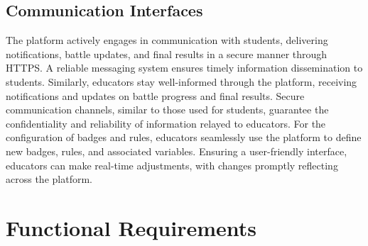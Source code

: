 \subsection{Communication Interfaces}
\label{subsec:communication_interfaces}%
The platform actively engages in communication with students, delivering notifications, battle updates, and final results in a secure manner through HTTPS. A reliable messaging system ensures timely information dissemination to students.
Similarly, educators stay well-informed through the platform, receiving notifications and updates on battle progress and final results. Secure communication channels, similar to those used for students, guarantee the confidentiality and reliability of information relayed to educators.
For the configuration of badges and rules, educators seamlessly use the platform to define new badges, rules, and associated variables. Ensuring a user-friendly interface, educators can make real-time adjustments, with changes promptly reflecting across the platform.

\section{Functional Requirements}
\label{sec:functional_requirements}%

